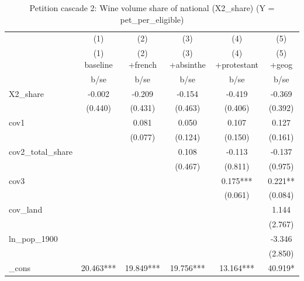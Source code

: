 \begin{table}[htbp]\centering
\def\sym#1{\ifmmode^{#1}\else\(^{#1}\)\fi}
\caption{Petition cascade 2: Wine volume share of national (X2\_share)  (Y = pet\_per\_eligible) \label{tab:petcasc2}}
\begin{tabular}{l*{5}{c}}
\toprule
            &\multicolumn{1}{c}{(1)}&\multicolumn{1}{c}{(2)}&\multicolumn{1}{c}{(3)}&\multicolumn{1}{c}{(4)}&\multicolumn{1}{c}{(5)}\\
            &\multicolumn{1}{c}{(1) baseline}&\multicolumn{1}{c}{(2) +french}&\multicolumn{1}{c}{(3) +absinthe}&\multicolumn{1}{c}{(4) +protestant}&\multicolumn{1}{c}{(5) +geog}\\
            &        b/se   &        b/se   &        b/se   &        b/se   &        b/se   \\
\midrule
X2\_share    &      -0.002   &      -0.209   &      -0.154   &      -0.419   &      -0.369   \\
            &     (0.440)   &     (0.431)   &     (0.463)   &     (0.406)   &     (0.392)   \\
cov1        &               &       0.081   &       0.050   &       0.107   &       0.127   \\
            &               &     (0.077)   &     (0.124)   &     (0.150)   &     (0.161)   \\
cov2\_total\_share&               &               &       0.108   &      -0.113   &      -0.137   \\
            &               &               &     (0.467)   &     (0.811)   &     (0.975)   \\
cov3        &               &               &               &       0.175***&       0.221** \\
            &               &               &               &     (0.061)   &     (0.084)   \\
cov\_land    &               &               &               &               &       1.144   \\
            &               &               &               &               &     (2.767)   \\
ln\_pop\_1900 &               &               &               &               &      -3.346   \\
            &               &               &               &               &     (2.850)   \\
\_cons      &      20.463***&      19.849***&      19.756***&      13.164***&      40.919*  \\

\end{tabular}
\end{table}
